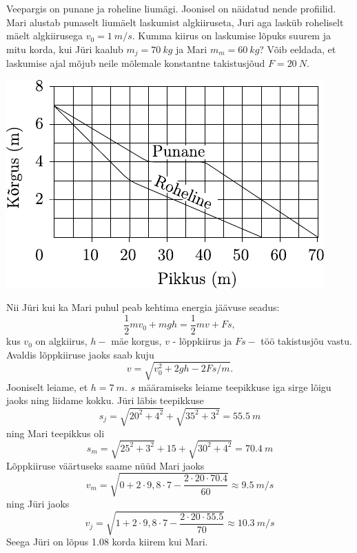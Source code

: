 
Veepargis on punane ja roheline liumägi. Joonisel on näidatud nende profiilid. Mari alustab punaselt liumäelt laskumist algkiiruseta, Juri aga lasküb roheliselt mäelt algkiirusega $v_0 = \SI{1}{m/s}$. Kumma kiirus on laskumise lõpuks suurem ja mitu korda, kui Jüri kaalub $m_j = \SI{70}{kg}$ ja Mari $m_m = \SI{60}{kg}$? Võib eeldada, et laskumise ajal mõjub neile mõlemale konstantne takistusjõud $F = \SI{20}{N}$.
\begin{center}
	\includegraphics[width=0.7\linewidth]{2004-v3g-02-yl.pdf}
\end{center}

\hint

\solu
Nii Jüri kui ka Mari puhul peab kehtima energia jäävuse seadus:
$$
\frac{1}{2} m v_{0}+m g h=\frac{1}{2} m v+F s,
$$
kus $v_{0}$ on algkiirus, $h-$ mäe korgus, $v$ - lõppkiirus ja $F s-$ töö takistusjõu vastu. Avaldis lõppkiiruse jaoks saab kuju
$$
v=\sqrt{v_{0}^{2}+2 g h-2 F s / m}.
$$
Jooniselt leiame, et $h=\SI{7}{m}$. $s$ määramiseks leiame teepikkuse iga sirge lõigu jaoks ning liidame kokku. Jüri läbis teepikkuse
$$
s_{j}=\sqrt{20^{2}+4^{2}}+\sqrt{35^{2}+3^{2}}=\SI{55,5}{m}
$$
ning Mari teepikkus oli
$$
s_{m}=\sqrt{25^{2}+3^{2}}+15+\sqrt{30^{2}+4^{2}}=\SI{70,4}{m}
$$
Lõppkiiruse väärtuseks saame nüüd Mari jaoks
$$
v_{m}=\sqrt{0+2 \cdot 9,8 \cdot 7-\frac{2 \cdot 20 \cdot \num{70,4}}{60}} \approx \SI{9,5}{m/s}
$$
ning Jüri jaoks
$$
v_{j}=\sqrt{1+2 \cdot 9,8 \cdot 7-\frac{2 \cdot 20 \cdot \num{55,5}}{70}} \approx \SI{10,3}{m/s}
$$
Seega Jüri on lõpus \num{1,08} korda kiirem kui Mari.
\probend